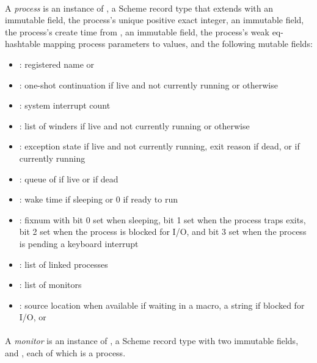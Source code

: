 \paragraph {}
A \emph{process} is an instance of , a Scheme record type
that extends  with an immutable  field, the process's
unique positive exact integer, an immutable  field,
the process's create time from , an immutable
 field, the process's weak eq-hashtable mapping
process parameters to values, and the following mutable fields:
\begin{itemize}
\item {}: registered name or 
\item {}: one-shot continuation if live and not currently
  running or  otherwise
\item {}: system interrupt count
\item {}: list of winders if live and not currently
  running or \code{()} otherwise
\item {}: exception state if live and not
  currently running, exit reason if dead, or  if currently
  running
\item {}: queue of  if live or  if
  dead
\item {}: wake time if sleeping or 0 if ready to run
\item {}: fixnum with bit 0 set when sleeping, bit 1 set
  when the process traps exits, bit 2 set when the process is
  blocked for I/O, and bit 3 set when the process is pending a
  keyboard interrupt
\item {}: list of linked processes
\item {}: list of monitors
\item {}: source location  when available if waiting in a 
  macro, a string if blocked for I/O, or 
\end{itemize}

\paragraph {}
A \emph{monitor} is an instance of , a Scheme record type
with two immutable fields,  and , each
of which is a process.

